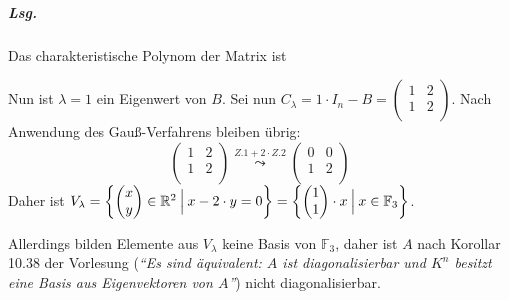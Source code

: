 \documentclass{scrreprt}
\begin{document}
\begin{enumerate}[(a)]
  \subparagraph{Lsg.} Das charakteristische Polynom der Matrix ist
  Nun ist $\lambda = 1$ ein Eigenwert von $B$.
  Sei nun $C_\lambda = 1 \cdot I_n - B = \begin{pmatrix}
    1 & 2 \\
    1 & 2 \\
  \end{pmatrix}$.
  Nach Anwendung des Gauß-Verfahrens bleiben übrig:
  \[
    \begin{pmatrix}
      1 & 2 \\
      1 & 2 \\
    \end{pmatrix}
    \overset{Z.1 + 2 \cdot Z.2}\leadsto
    \begin{pmatrix}
      0 & 0 \\
      1 & 2 \\
    \end{pmatrix}
  \]
  Daher ist $V_{\lambda} = \qty{
    \begin{pmatrix}x\\y\end{pmatrix} \in \mathbb{R}^2
    \:{\Big |}\:
    x -2 \cdot y = 0
  } = \qty{
    \begin{pmatrix}1\\1\end{pmatrix} \cdot x
    \:{\Big |}\:
    x \in \mathbb{F}_3
  }$.

  Allerdings bilden Elemente aus $V_\lambda$ keine Basis von $\mathbb{F}_3$,
  daher ist $A$ nach Korollar 10.38 der Vorlesung (\emph{``Es sind äquivalent:
    $A$ ist diagonalisierbar und $K^n$ besitzt eine Basis aus Eigenvektoren von
    $A$''}) nicht diagonalisierbar.


\end{enumerate}
\end{document}
